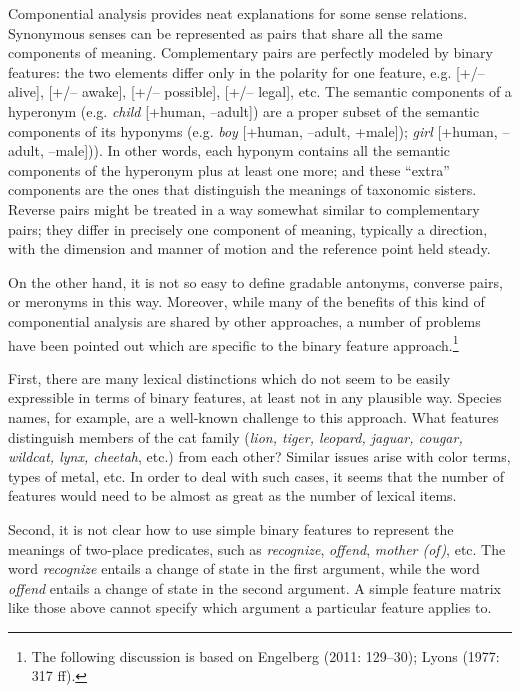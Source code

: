 Componential analysis provides neat explanations for some sense relations. Synonymous senses can be represented as pairs that share all the same components of meaning. Complementary pairs are perfectly modeled by binary features: the two elements differ only in the polarity for one feature, e.g. [+/– alive], [+/– awake], [+/– possible], [+/– legal], etc. The semantic components of a hyperonym (e.g. \textit{child} [+human, –adult]) are a proper subset of the semantic components of its hyponyms (e.g. \textit{boy} [+human, –adult, +male]); \textit{girl} [+human, –adult, –male])). In other words, each hyponym contains all the semantic components of the hyperonym plus at least one more; and these “extra” components are the ones that distinguish the meanings of taxonomic sisters. Reverse pairs might be treated in a way somewhat similar to complementary pairs; they differ in precisely one component of meaning, typically a direction, with the dimension and manner of motion and the reference point held steady.



On the other hand, it is not so easy to define gradable antonyms, converse pairs, or meronyms in this way. Moreover, while many of the benefits of this kind of componential analysis are shared by other approaches, a number of problems have been pointed out which are specific to the binary feature approach.\footnote{The following discussion is based on Engelberg (2011: 129–30); Lyons (1977: 317 ff).}



First, there are many lexical distinctions which do not seem to be easily expressible in terms of binary features, at least not in any plausible way. Species names, for example, are a well-known challenge to this approach. What features distinguish members of the cat family (\textit{lion, tiger, leopard, jaguar, cougar, wildcat, lynx, cheetah}, etc.) from each other? Similar issues arise with color terms, types of metal, etc. In order to deal with such cases, it seems that the number of features would need to be almost as great as the number of lexical items.



Second, it is not clear how to use simple binary features to represent the meanings of two-place predicates, such as \textit{recognize}, \textit{offend}, \textit{mother (of)}, etc. The word \textit{recognize} entails a change of state in the first argument, while the word \textit{offend} entails a change of state in the second argument. A simple feature matrix like those above cannot specify which argument a particular feature applies to.



